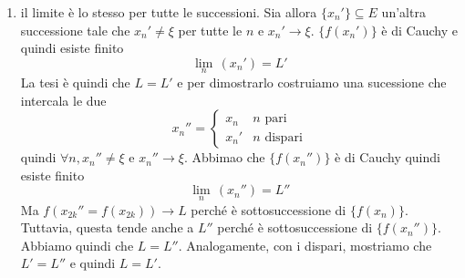 \documentclass[a4paper]{article}
\begin{document}
{{\begin{enumerate}
            Per ipotesi, \(x_n \in E\) e \(x_n \neq \xi\) per tutte le \(n\)
            e \(x_n \to \xi\) quindi esiste \(N\) tale che \(\forall n \geq N, x_n \in (J \cap E) \backslash \{\xi\}\).
            Quindi \(\forall n,m \geq N\), \(x_n,x_m \in (J \cap E) \backslash \{\xi\}\)
            da cui \(|f(x_n) - f(x_m)| < \varepsilon\) come si voleva;
            \item il limite è lo stesso per tutte le successioni.
            Sia allora \(\{x_n'\} \subseteq E\) un'altra successione tale che
            \(x_n' \neq \xi\) per tutte le \(n\) e \(x_n' \to \xi\).
            \(\{f(x_n')\}\) è di Cauchy e quindi esiste finito
            \[
                \underset{n}{\lim}\,(x_n') = L'
            \]
            La tesi è quindi che \(L=L'\) e per dimostrarlo costruiamo
            una sucessione che intercala le due
            \[
                x_n'' = \begin{cases}
                    x_n & n \text{ pari} \\
                    x_n' & n \text{ dispari}
                \end{cases}
            \]
            quindi \(\forall n,x_n'' \neq \xi\) e \(x_n'' \to \xi\).
            Abbimao che \(\{f(x_n'')\}\) è di Cauchy quindi esiste finito
            \[
                \underset{n}{\lim}\,(x_n'') = L''
            \]
            Ma \(f(x_{2k}'' = f(x_{2k})) \to L\) perché è sottosuccessione di \(\{f(x_n)\}\).
            Tuttavia, questa tende anche a \(L''\) perché è sottosuccessione di \(\{f(x_n'')\}\).
            Abbiamo quindi che \(L=L''\).
            Analogamente, con i dispari, mostriamo che \(L'=L''\)
            e quindi \(L=L'\).
        \end{enumerate}

    }
}

\pagebreak

\end{document}
